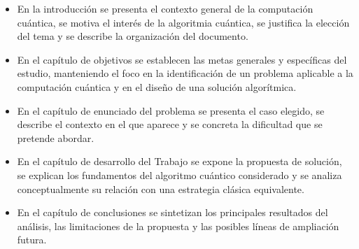 \begin{itemize}
	\item En la introducción se presenta el contexto general de la computación cuántica, se motiva el interés de la algoritmia cuántica, se justifica la elección del tema y se describe la organización del documento.
	\item En el capítulo de objetivos se establecen las metas generales y específicas del estudio, manteniendo el foco en la identificación de un problema aplicable a la computación cuántica y en el diseño de una solución algorítmica.
	\item En el capítulo de enunciado del problema se presenta el caso elegido, se describe el contexto en el que aparece y se concreta la dificultad que se pretende abordar.
	\item En el capítulo de desarrollo del Trabajo se expone la propuesta de solución, se explican los fundamentos del algoritmo cuántico considerado y se analiza conceptualmente su relación con una estrategia clásica equivalente.
	\item En el capítulo de conclusiones se sintetizan los principales resultados del análisis, las limitaciones de la propuesta y las posibles líneas de ampliación futura.
\end{itemize}

